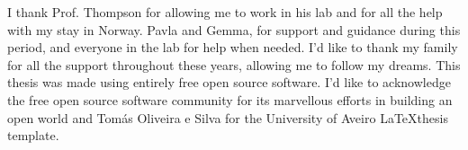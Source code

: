 \documentclass[11pt,twoside,a4paper]{report}
\begin{document}
\cleardoublepage


\TitlePage
  \vspace*{55mm}
        {I thank Prof. Thompson for allowing me to work in his lab and for all the help with my stay in Norway. Pavla and Gemma, for support and guidance during this period, and everyone in the lab for help when needed.}
    \TEXT{}
        {I'd like to thank my family for all the support throughout these years, allowing me to follow my dreams.}
    \TEXT{}
		{This thesis was made using entirely free open source software. I'd like to acknowledge the free open source software community for its marvellous efforts in building an open world and Tomás Oliveira e Silva for the University of Aveiro \LaTeX thesis template.}

\EndTitlePage

\cleardoublepage

\end{document}
